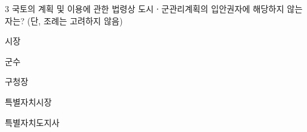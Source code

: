 \begin{question}{3}
국토의 계획 및 이용에 관한 법령상 도시ㆍ군관리계획의 입안권자에 해당하지 않는 자는? (단, 조례는 고려하지 않음)
\begin{choices}
  \item 시장
  \item 군수
  \item 구청장
  \item 특별자치시장
  \item 특별자치도지사
\end{choices}
\end{question}
